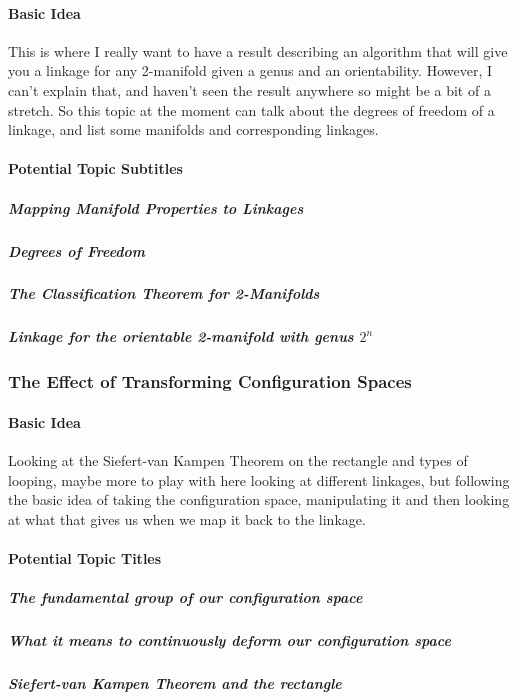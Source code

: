 \documentclass[
]{article}
\begin{document}
\hypertarget{header-n27}{%
\paragraph{Basic Idea}\label{header-n27}}

This is where I really want to have a result describing an algorithm
that will give you a linkage for any 2-manifold given a genus and an
orientability. However, I can't explain that, and haven't seen the
result anywhere so might be a bit of a stretch. So this topic at the
moment can talk about the degrees of freedom of a linkage, and list some
manifolds and corresponding linkages.

\hypertarget{header-n29}{%
\paragraph{Potential Topic Subtitles}\label{header-n29}}

\hypertarget{header-n30}{%
\subparagraph{Mapping Manifold Properties to
Linkages}\label{header-n30}}

\hypertarget{header-n31}{%
\subparagraph{Degrees of Freedom}\label{header-n31}}

\hypertarget{header-n32}{%
\subparagraph{The Classification Theorem for
2-Manifolds}\label{header-n32}}

\hypertarget{header-n33}{%
\subparagraph{\texorpdfstring{Linkage for the orientable 2-manifold with
genus
\(2^n\)}{Linkage for the orientable 2-manifold with genus 2\^{}n}}\label{header-n33}}

\hypertarget{header-n34}{%
\subsubsection{The Effect of Transforming Configuration
Spaces}\label{header-n34}}

\hypertarget{header-n35}{%
\paragraph{Basic Idea}\label{header-n35}}

Looking at the Siefert-van Kampen Theorem on the rectangle and types of
looping, maybe more to play with here looking at different linkages, but
following the basic idea of taking the configuration space, manipulating
it and then looking at what that gives us when we map it back to the
linkage.

\hypertarget{header-n37}{%
\paragraph{Potential Topic Titles}\label{header-n37}}

\hypertarget{header-n38}{%
\subparagraph{The fundamental group of our configuration
space}\label{header-n38}}

\hypertarget{header-n39}{%
\subparagraph{What it means to continuously deform our configuration
space}\label{header-n39}}

\hypertarget{header-n40}{%
\subparagraph{Siefert-van Kampen Theorem and the
rectangle}\label{header-n40}}
\end{document}
